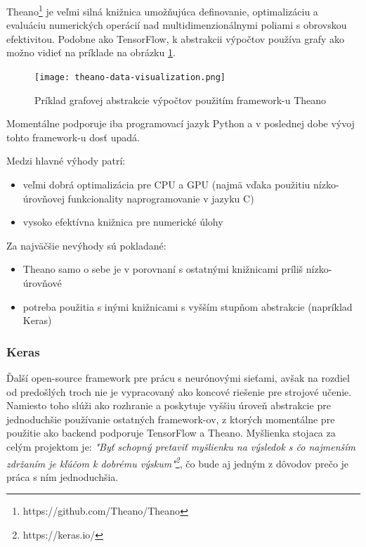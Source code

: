 Theano\footnote{https://github.com/Theano/Theano} je veľmi silná knižnica umožňujúca definovanie, optimalizáciu a evaluáciu numerických operácií nad multidimenzionálnymi poliami s obrovskou efektivitou. Podobne ako TensorFlow, k abstrakcii výpočtov používa grafy ako možno vidieť na príklade na obrázku \ref{theano_image}.


\begin{figure}[H]
	\begin{center}\texttt{[image: theano-data-visualization.png]}
		\caption[Príklad grafovej abstrakcie výpočtov použitím framework-u Theano]{
			Príklad grafovej abstrakcie výpočtov použitím framework-u Theano\footnotemark
		}\label{theano_image}
	\end{center}
\end{figure}

Momentálne podporuje iba programovací jazyk Python a v poslednej dobe vývoj tohto framework-u dosť upadá.

Medzi hlavné výhody patrí:
\begin{itemize}
	\item veľmi dobrá optimalizácia pre CPU a GPU (najmä vďaka použitiu nízko-úrovňovej funkcionality naprogramovanie v jazyku C)
	\item vysoko efektívna knižnica pre numerické úlohy
\end{itemize}

Za najväčšie nevýhody sú pokladané:
\begin{itemize}
	\item Theano samo o sebe je v porovnaní s ostatnými knižnicami príliš nízko-úrovňové
	\item potreba použitia s inými knižnicami s vyšším stupňom abstrakcie (napríklad Keras) 
\end{itemize}

\subsubsection{Keras}\label{keras}

Ďalší open-source framework pre prácu s neurónovými sieťami, avšak na rozdiel od predošlých troch nie je vypracovaný ako koncové riešenie pre strojové učenie. Namiesto toho slúži ako rozhranie a poskytuje vyššiu úroveň abstrakcie pre jednoduchšie používanie ostatných framework-ov, z ktorých momentálne pre použitie ako backend podporuje TensorFlow a Theano. Myšlienka stojaca za celým projektom je: \textit{"Byť schopný pretaviť myšlienku na výsledok s čo najmenším zdržaním je kľúčom k dobrému výskum"\footnote{https://keras.io/}}, čo bude aj jedným z dôvodov prečo je práca s ním jednoduchšia.

